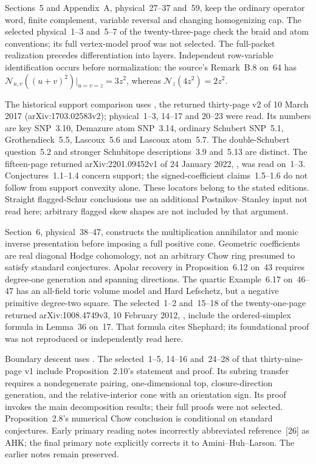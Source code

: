 Sections~5 and Appendix~A, physical~27--37 and~59, keep the
ordinary operator word, finite complement, variable reversal and
changing homogenizing cap. The selected physical~1--3 and~5--7
of the twenty-three-page
\cite{BuciumasScrimshawWeber20LascouxV2} check the braid and
atom conventions; its full vertex-model proof was not selected.
The full-packet realization precedes differentiation into layers.
Independent row-variable identification occurs before normalization:
the source's Remark~B.8 on~64 has
$\mathcal N_{u,v}((u+v)^2)|_{u=v=z}=3z^2$, whereas
$\mathcal N_z(4z^2)=2z^2$.

The historical support comparison uses
\cite{MonicalTokcanYong17NewtonV2}, the returned thirty-page
v2 of 10 March 2017 (arXiv:1703.02583v2); physical~1--3, 14--17 and
20--23 were read. Its numbers are key SNP~3.10, Demazure
atom SNP~3.14, ordinary Schubert SNP~5.1, Grothendieck~5.5,
Lascoux~5.6 and Lascoux atom~5.7. The double-Schubert
question~5.2 and stronger Schubitope descriptions~3.9 and~5.13
are distinct. The fifteen-page returned arXiv:2201.09452v1 of
24 January 2022, \cite{MeszarosSetiabrataStDizier22SupportV1},
was read on~1--3. Conjectures~1.1--1.4 concern support;
the signed-coefficient claims~1.5--1.6 do not follow from
support convexity alone. These locators belong to the stated
editions. Straight flagged-Schur conclusions use an additional
Postnikov--Stanley input not read here; arbitrary flagged skew
shapes are not included by that argument.

Section~6, physical~38--47, constructs the multiplication
annihilator and monic inverse presentation before imposing a
full positive cone. Geometric coefficients are real diagonal
Hodge cohomology, not an arbitrary Chow ring presumed to
satisfy standard conjectures. Apolar recovery in Proposition~6.12
on~43 requires degree-one generation and spanning directions.
The quartic Example~6.17 on~46--47 has an all-field toric
volume model and Hard Lefschetz, but a negative primitive
degree-two square. The selected~1--2 and~15--18 of the
twenty-one-page returned arXiv:1008.4749v3, 10 February 2012,
\cite{Huh12MilnorV3}, include the ordered-simplex formula in
Lemma~36 on~17. That formula cites Shephard; its foundational
proof was not reproduced or independently read here.

Boundary descent uses
\cite[Lemma~4.6, physical p.~26]{AminiHuhLarson25DecompositionV1}.
The selected~1--5, 14--16 and~24--28 of that thirty-nine-page
v1 include Proposition~2.10's statement and proof. Its subring
transfer requires a nondegenerate pairing, one-dimensional top,
closure-direction generation, and the relative-interior cone
with an orientation sign. Its proof invokes the main decomposition
results; their full proofs were not selected. Proposition~2.8's
numerical Chow conclusion is conditional on standard conjectures.
Early primary reading notes incorrectly abbreviated reference~[26]
as AHK; the final primary note explicitly corrects it to
Amini--Huh--Larson. The earlier notes remain preserved.

